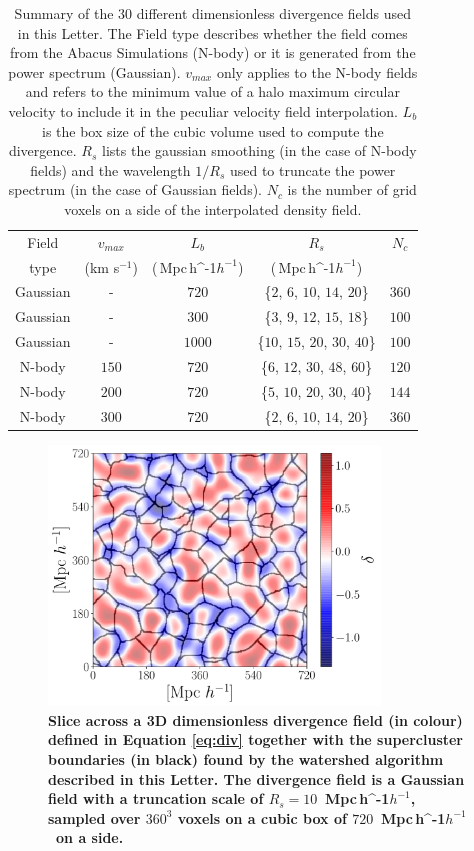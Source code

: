 \documentclass[usenatbib]{mnras}
\newcommand{\Mpch}{\,{\rm Mpc}\,\ifmmode h^{-1}\else $h^{-1}$\fi}
\begin{document}
\begin{table}
\begin{tabular}{c c c c c}\hline
Field &  $v_{max}$ & $L_b$ & $R_s$ & $N_c$\\
type & (km s$^{-1}$) & (\Mpch) & (\Mpch) & \\\hline
Gaussian & - & $720$ & \{$2$, $6$, $10$, $14$, $20$\} & $360$\\
Gaussian & - & $300$ & \{$3$, $9$, $12$, $15$, $18$\} & $100$\\
Gaussian & - & $1000$ & \{$10$, $15$, $20$, $30$, $40$\} & $100$\\
N-body & $150$ & $720$ & \{$6$, $12$, $30$, $48$, $60$\} & $120$\\
N-body & $200$ & $720$ & \{$5$, $10$, $20$, $30$, $40$\} & $144$\\
N-body & $300$ & $720$ & \{$2$, $6$, $10$, $14$, $20$\} & $360$\\\hline
\end{tabular}
\caption{Summary of the $30$ different dimensionless divergence fields used in this Letter. 
The Field type describes whether the field comes from the Abacus Simulations (N-body) or it is generated from the power spectrum (Gaussian). $v_{max}$ only applies to the N-body fields and refers to the minimum value of a halo maximum circular velocity to include it in the peculiar velocity field interpolation.
$L_b$ is the box size of the cubic volume used to compute the divergence. $R_{s}$ lists the gaussian smoothing (in the case of N-body fields) and the wavelength $1/R_s$ used to truncate the power spectrum (in the case of Gaussian fields). $N_c$ is the number of grid voxels on a side of the interpolated density field.}
\label{table:values}
\end{table}


\begin{figure}
    \centering
    \includegraphics[width=250pt]{example_watershed.pdf}
    \caption{\textbf{Slice across a 3D dimensionless divergence field (in colour) defined in Equation \ref{eq:div} together with the supercluster boundaries (in black) found by the watershed algorithm described in this Letter. 
    The divergence field is a Gaussian field with a truncation scale of $R_s=10$ \Mpch, sampled over $360^3$ voxels on a cubic box of $720$ \Mpch\ on a side.}
    \label{fig:illustration}}
\end{figure}
\end{document}
